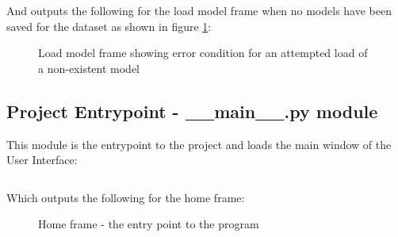 \documentclass[./project-report/src/latex/project-report.tex]{subfiles}
\begin{document}
\begin{itemize}
        And outputs the following for the load model frame when no models have been saved for the dataset as shown in figure \ref{fig:load-model-frame-impl-error}:

        \begin{figure}[h!]
        \centering
        \caption{Load model frame showing error condition for an attempted load of a non-existent model}
        \label{fig:load-model-frame-impl-error}
        \end{figure}
\end{itemize}

\subsection{Project Entrypoint - \_\_main\_\_.py module}

This module is the entrypoint to the project and loads the main window of the User Interface:

\label{sec:__main__-module}
\inputminted{python}{./school_project/__main__.py}

Which outputs the following for the home frame:

\begin{figure}[h!]
\centering
{}
\caption{Home frame - the entry point to the program}
\label{fig:home-frame-impl}
\end{figure}
\end{document}

